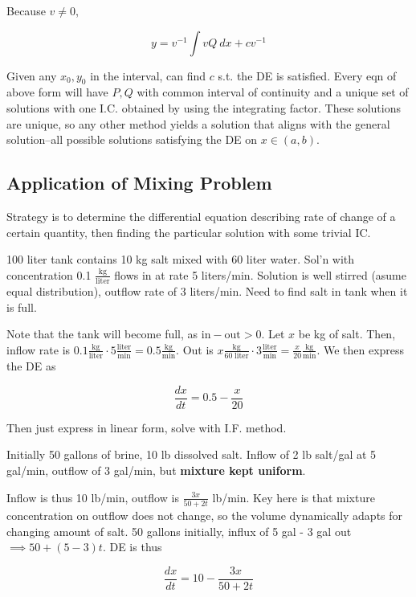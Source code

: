Because $v\neq 0$,

\begin{equation}
    y=v^{-1}\int vQ\: dx + cv^{-1}
\end{equation}

Given any $x_0,y_0$ in the interval, can find $c$ s.t. the DE is satisfied.
Every eqn of above form will have $P,Q$ with common interval of continuity and a unique set of solutions with one I.C. obtained by using the integrating factor.
These solutions are unique, so any other method yields a solution that aligns with the general solution–all possible solutions satisfying the DE on $x\in (a,b)$.

\subsection{Application of Mixing Problem}

Strategy is to determine the differential equation describing rate of change of a certain quantity, then finding the particular solution with some trivial IC.

\begin{example}
    100 liter tank contains 10 kg salt mixed with 60 liter water. Sol'n with concentration 0.1 $\frac{\mathrm{kg}}{\mathrm{liter}}$ flows in at rate 5 liters/min.
    Solution is well stirred (asume equal distribution), outflow rate of 3 liters/min. Need to find salt in tank when it is full.

    Note that the tank will become full, as $\mathrm{in}-\mathrm{out}>0$. Let $x$ be kg of salt.
    Then, inflow rate is $0.1 \frac{\mathrm{kg}}{\mathrm{liter}}\cdot 5\frac{\mathrm{liter}}{\mathrm{min}}=0.5\frac{\mathrm{kg}}{\mathrm{min}}$. Out is
    $x \frac{\mathrm{kg}}{60\;\mathrm{liter}}\cdot 3\frac{\mathrm{liter}}{\mathrm{min}}=\frac{x}{20}\frac{\mathrm{kg}}{\mathrm{min}}$. We then express the DE as

    \begin{equation}
        \frac{dx}{dt}=0.5-\frac{x}{20}
    \end{equation}

    Then just express in linear form, solve with I.F. method.
\end{example}

\begin{example}
    Initially 50 gallons of brine, 10 lb dissolved salt. Inflow of 2 lb salt/gal at 5 gal/min, outflow of 3 gal/min, but \textbf{mixture kept uniform}.

    Inflow is thus 10 lb/min, outflow is $\frac{3x}{50+2t}$ lb/min. Key here is that mixture concentration on outflow does not change, so the volume dynamically adapts for changing amount of salt.
    50 gallons initially, influx of 5 gal - 3 gal out $\implies 50+(5-3)t$.
    DE is thus

    \begin{equation}
        \frac{dx}{dt}=10-\frac{3x}{50+2t}
    \end{equation}
\end{example}

